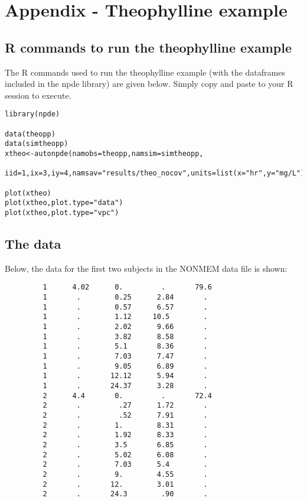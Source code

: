 \newpage
{}
\section*{Appendix - Theophylline example}

\subsection*{R commands to run the theophylline example}\label{sec:Rcmdtheo}

\hskip 18pt The R commands used to run the theophylline example (with the dataframes included in the npde library) are given below. Simply copy and paste to your R session to execute.

{\small
\begin{verbatim}
library(npde)

data(theopp)
data(simtheopp)
xtheo<-autonpde(namobs=theopp,namsim=simtheopp,
  iid=1,ix=3,iy=4,namsav="results/theo_nocov",units=list(x="hr",y="mg/L"))

plot(xtheo)
plot(xtheo,plot.type="data")
plot(xtheo,plot.type="vpc")
\end{verbatim}
}

\newpage
{}
\subsection*{The data} \label{sec:appdata}
\hskip 18pt Below, the data for the first two subjects in the NONMEM data file is shown:
{\small
\begin{verbatim}
         1      4.02      0.         .       79.6
         1       .        0.25      2.84       .
         1       .        0.57      6.57       .
         1       .        1.12     10.5        .
         1       .        2.02      9.66       .
         1       .        3.82      8.58       .
         1       .        5.1       8.36       .
         1       .        7.03      7.47       .
         1       .        9.05      6.89       .
         1       .       12.12      5.94       .
         1       .       24.37      3.28       .
         2      4.4       0.         .       72.4
         2       .         .27      1.72       .
         2       .         .52      7.91       .
         2       .        1.        8.31       .
         2       .        1.92      8.33       .
         2       .        3.5       6.85       .
         2       .        5.02      6.08       .
         2       .        7.03      5.4        .
         2       .        9.        4.55       .
         2       .       12.        3.01       .
         2       .       24.3        .90       .
\end{verbatim}
}

